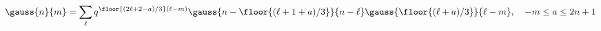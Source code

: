 \begin{equation}
\gauss{n}{m}=\sum_\ell q^{\floor{(2\ell+2-a)/3}(\ell-m)}
               \gauss{n-\floor{(\ell+1+a)/3}}{n-\ell}     \gauss{\floor{(\ell+a)/3}}{\ell-m},
\quad -m\le a\le 2n+1
\end{equation}

